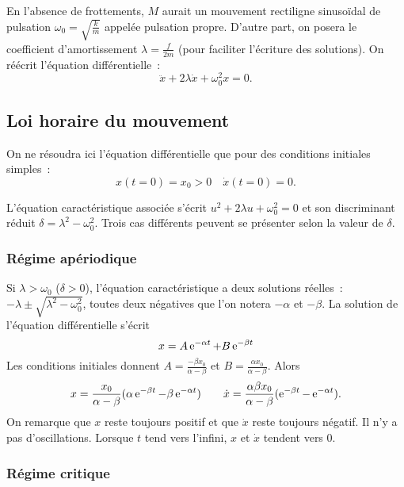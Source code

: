 En l'absence de frottements, $M$ aurait un mouvement rectiligne sinusoïdal de pulsation $\omega_0 = \sqrt{\frac{k}{m}}$ appelée pulsation propre. D'autre part, on posera le coefficient d'amortissement $\lambda = \frac{f}{2m}$ (pour faciliter l'écriture des solutions). On réécrit l'équation différentielle~:
\begin{equation}
  \ddot x + 2\lambda \dot x + \omega_0^2 x =0.
\end{equation}

\subsection{Loi horaire du mouvement}
\label{chap5-subsec:loihorairedumouvement}

On ne résoudra ici l'équation différentielle que pour des conditions initiales simples~:
\begin{equation}
  x(t=0) = x_0>0 \quad \dot x(t=0)=0.
\end{equation}

L'équation caractéristique associée s'écrit $u^2+2\lambda u + \omega_0^2=0$ et son discriminant réduit $\delta = \lambda^2-\omega_0^2$. Trois cas différents peuvent se présenter selon la valeur de $\delta$.

\subsubsection{Régime apériodique}
\label{chap5-subsubsec:aperiodique}

Si $\lambda>\omega_0$ ($\delta>0$), l'équation caractéristique a deux solutions réelles~: $-\lambda \pm \sqrt{\lambda^2-\omega_0^2}$, toutes deux négatives que l'on notera $-\alpha$ et $-\beta$. La solution de l'équation différentielle s'écrit
\begin{equation}
  x = A\operatorname{e}^{-\alpha t} +B\operatorname{e}^{-\beta t}
\end{equation}
Les conditions initiales donnent $A=\frac{-\beta x_0}{\alpha-\beta}$ et $B=\frac{\alpha x_0}{\alpha-\beta}$. Alors
\begin{equation}
  x = \frac{x_0}{\alpha - \beta}(\alpha \operatorname{e}^{-\beta t} - \beta \operatorname{e}^{-\alpha t}) \qquad \dot x = \frac{\alpha \beta x_0}{\alpha - \beta}(\operatorname{e}^{-\beta t} - \operatorname{e}^{-\alpha t}).
\end{equation}
On remarque que $x$ reste toujours positif et que $\dot x$ reste toujours négatif. Il n'y a pas d'oscillations. Lorsque $t$ tend vers l'infini, $x$ et $\dot x$ tendent vers $0$.

\subsubsection{Régime critique}
\label{chap5-subsubsec:critique}


